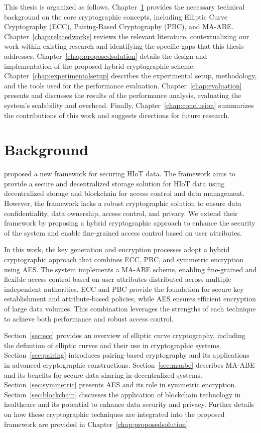 \documentclass[cic,tc,english]{iiufrgs}
\numberwithin{algorithm}{chapter}
\begin{document}
    This thesis is organized as follows. Chapter~\ref{chap:background} provides the necessary technical background on the core cryptographic concepts, including Elliptic Curve Cryptography (ECC), Pairing-Based Cryptography (PBC), and MA-ABE. Chapter~\ref{chap:relatedworks} reviews the relevant literature, contextualizing our work within existing research and identifying the specific gaps that this thesis addresses. Chapter~\ref{chap:proposedsolution} details the design and implementation of the proposed hybrid cryptographic scheme. Chapter~\ref{chap:experimentalsetup} describes the experimental setup, methodology, and the tools used for the performance evaluation. Chapter~\ref{chap:evaluation} presents and discusses the results of the performance analysis, evaluating the system's scalability and overhead. Finally, Chapter~\ref{chap:conclusion} summarizes the contributions of this work and suggests directions for future research.


\chapter{Background}
    \label{chap:background}

    \citet{laura2023} proposed a new framework for securing HIoT data. The framework aims to provide a secure and decentralized storage solution for HIoT data using decentralized storage and blockchain for access control and data management. However, the framework lacks a robust cryptographic solution to ensure data confidentiality, data ownership, access control, and privacy. We extend their framework by proposing a hybrid cryptographic approach to enhance the security of the system and enable fine-grained access control based on user attributes.

    In this work, the key generation and encryption processes adopt a hybrid cryptographic approach that combines ECC, PBC, and symmetric encryption using AES. The system implements a MA-ABE scheme, enabling fine-grained and flexible access control based on user attributes distributed across multiple independent authorities. ECC and PBC provide the foundation for secure key establishment and attribute-based policies, while AES ensures efficient encryption of large data volumes. This combination leverages the strengths of each technique to achieve both performance and robust access control.



    Section~\ref{sec:ecc} provides an overview of elliptic curve cryptography, including the definition of elliptic curves and their use in cryptographic systems. Section~\ref{sec:pairing} introduces pairing-based cryptography and its applications in advanced cryptographic constructions. Section~\ref{sec:maabe} describes MA-ABE and its benefits for secure data sharing in decentralized systems. Section~\ref{sec:symmetric} presents AES and its role in symmetric encryption. Section~\ref{sec:blockchain} discusses the application of blockchain technology in healthcare and its potential to enhance data security and privacy. Further details on how these cryptographic techniques are integrated into the proposed framework are provided in Chapter~\ref{chap:proposedsolution}.
    
\end{document}
